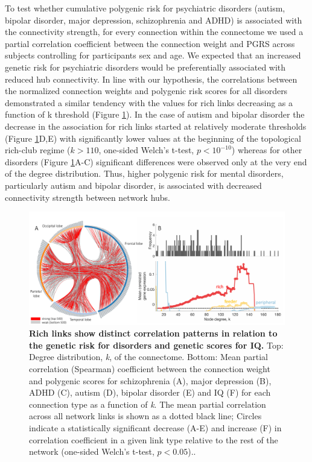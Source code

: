 To test whether cumulative polygenic risk for psychiatric disorders (autism, bipolar disorder, major depression, schizophrenia and ADHD) is associated with the connectivity strength, for every connection within the connectome we used a partial correlation coefficient between the connection weight and PGRS across subjects controlling for participants sex and age. We expected that an increased genetic risk for psychiatric disorders would be preferentially associated with reduced hub connectivity. In line with our hypothesis, the correlations between the normalized connection weights and polygenic risk scores for all disorders demonstrated a similar tendency with the values for rich links decreasing as a function of k threshold (Figure \ref{fig:Ch5Fig5}). In the case of autism and bipolar disorder the decrease in the association for rich links started at relatively moderate thresholds (Figure \ref{fig:Ch5Fig5}D,E) with significantly lower values at the beginning of the topological rich-club regime ($k>110$, one-sided Welch's t-test, $p < 10^{-10}$) whereas for other disorders (Figure \ref{fig:Ch5Fig5}A-C) significant differences were observed only at the very end of the degree distribution. Thus, higher polygenic risk for mental disorders, particularly autism and bipolar disorder, is associated with decreased connectivity strength between network hubs. 

\begin{figure}[h!]
\begin{center}
\includegraphics[width=1\textwidth]{Chapter5/Ch5Fig5.pdf}%
\end{center}
\caption{\textbf{Rich links show distinct correlation patterns in relation to the genetic risk for disorders and genetic scores for IQ.} 
Top: Degree distribution, \textit{k}, of the connectome. Bottom: Mean partial correlation (Spearman) coefficient between the connection weight and polygenic scores for schizophrenia (A), major depression (B), ADHD (C), autism (D), bipolar disorder (E) and IQ (F) for each connection type as a function of \textit{k}. The mean partial correlation across all network links is shown as a dotted black line; Circles indicate a statistically significant decrease (A-E) and increase (F) in correlation coefficient in a given link type relative to the rest of the network (one-sided Welch's t-test, $p < 0.05$)..}
\label{fig:Ch5Fig5}
\end{figure}

